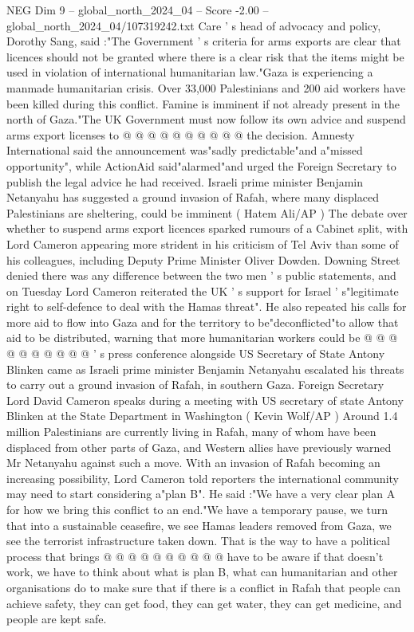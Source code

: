 \begin{textsample}{NEG Dim 9 – global\_north\_2024\_04 – Score -2.00 – global\_north\_2024\_04/107319242.txt}
Care ' s head of advocacy and policy, Dorothy Sang, said :"The Government ' s criteria for arms exports are clear that licences should not be granted where there is a clear risk that the items might be used in violation of international humanitarian law."Gaza is experiencing a manmade humanitarian crisis.
Over 33,000 Palestinians and 200 aid workers have been killed during this conflict.
Famine is imminent if not already present in the north of Gaza."The UK Government must now follow its own advice and suspend arms export licenses to @ @ @ @ @ @ @ @ @ @ the decision.
Amnesty International said the announcement was"sadly predictable"and a"missed opportunity", while ActionAid said"alarmed"and urged the Foreign Secretary to publish the legal advice he had received.
Israeli prime minister Benjamin Netanyahu has suggested a ground invasion of Rafah, where many displaced Palestinians are sheltering, could be imminent ( Hatem Ali/AP ) The debate over whether to suspend arms export licences sparked rumours of a Cabinet split, with Lord Cameron appearing more strident in his criticism of Tel Aviv than some of his colleagues, including Deputy Prime Minister Oliver Dowden.
Downing Street denied there was any difference between the two men ' s public statements, and on Tuesday Lord Cameron reiterated the UK ' s support for Israel ' s"legitimate right to self-defence to deal with the Hamas threat".
He also repeated his calls for more aid to flow into Gaza and for the territory to be"deconflicted"to allow that aid to be distributed, warning that more humanitarian workers could be @ @ @ @ @ @ @ @ @ @ ' s press conference alongside US Secretary of State Antony Blinken came as Israeli prime minister Benjamin Netanyahu escalated his threats to carry out a ground invasion of Rafah, in southern Gaza.
Foreign Secretary Lord David Cameron speaks during a meeting with US secretary of state Antony Blinken at the State Department in Washington ( Kevin Wolf/AP ) Around 1.4 million Palestinians are currently living in Rafah, many of whom have been displaced from other parts of Gaza, and Western allies have previously warned Mr Netanyahu against such a move.
With an invasion of Rafah becoming an increasing possibility, Lord Cameron told reporters the international community may need to start considering a"plan B".
He said :"We have a very clear plan A for how we bring this conflict to an end."We have a temporary pause, we turn that into a sustainable ceasefire, we see Hamas leaders removed from Gaza, we see the terrorist infrastructure taken down.
That is the way to have a political process that brings @ @ @ @ @ @ @ @ @ @ have to be aware if that doesn't work, we have to think about what is plan B, what can humanitarian and other organisations do to make sure that if there is a conflict in Rafah that people can achieve safety, they can get food, they can get water, they can get medicine, and people are kept safe.

\end{textsample}
